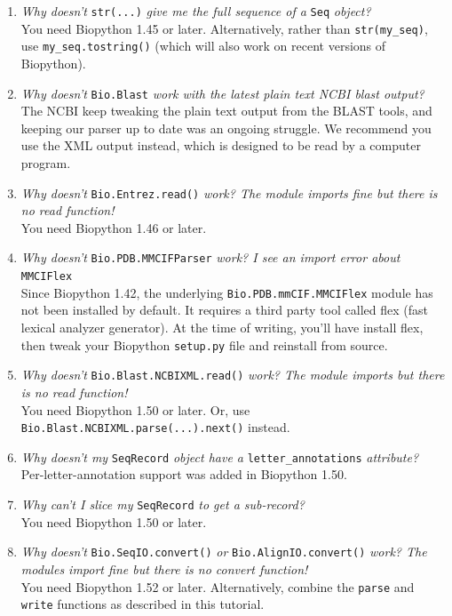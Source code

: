 \documentclass{report}
\begin{document}
\begin{enumerate}
  \item \emph{Why doesn't} \verb|str(...)| \emph{give me the full sequence of a} \verb|Seq| \emph{object?} \\
  You need Biopython 1.45 or later.  Alternatively, rather than \verb|str(my_seq)|, use \verb|my_seq.tostring()| (which will also work on recent versions of Biopython).
  
  \item \emph{Why doesn't} \verb|Bio.Blast| \emph{work with the latest plain text NCBI blast output?} \\
  The NCBI keep tweaking the plain text output from the BLAST tools, and keeping our parser up to date was an ongoing struggle.  We recommend you use the XML output instead, which is designed to be read by a computer program.

  \item \emph{Why doesn't} \verb|Bio.Entrez.read()| \emph{work? The module imports fine but there is no read function!} \\
  You need Biopython 1.46 or later.

  \item \emph{Why doesn't} \verb|Bio.PDB.MMCIFParser| \emph{work? I see an import error about} \verb|MMCIFlex| \\
  Since Biopython 1.42, the underlying \verb|Bio.PDB.mmCIF.MMCIFlex| module has
  not been installed by default.  It requires a third party tool called flex
  (fast lexical analyzer generator). At the time of writing, you'll have install
  flex, then tweak your Biopython \verb|setup.py| file and reinstall from source.

  \item \emph{Why doesn't} \verb|Bio.Blast.NCBIXML.read()| \emph{work? The module imports but there is no read function!} \\
  You need Biopython 1.50 or later.  Or, use \texttt{Bio.Blast.NCBIXML.parse(...).next()} instead.
  
  \item \emph{Why doesn't my} \verb|SeqRecord| \emph{object have a} \verb|letter_annotations| \emph{attribute?} \\
  Per-letter-annotation support was added in Biopython 1.50.
  
 \item \emph{Why can't I slice my} \verb|SeqRecord| \emph{to get a sub-record?} \\
  You need Biopython 1.50 or later.

  \item \emph{Why doesn't} \verb|Bio.SeqIO.convert()| \emph{or} \verb|Bio.AlignIO.convert()| \emph{work? The modules import fine but there is no convert function!} \\
  You need Biopython 1.52 or later. Alternatively, combine the \verb|parse| and \verb|write|
  functions as described in this tutorial.


\end{enumerate}
\end{document}
